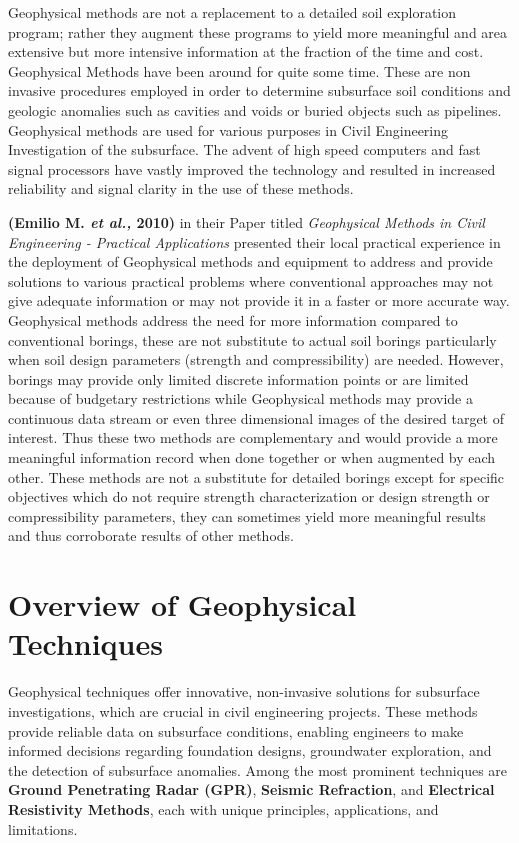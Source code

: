 \documentclass[12pt,a4paper]{report}
\begin{document}
Geophysical methods are not a replacement to a detailed soil exploration program; rather they augment these programs to yield more meaningful and area extensive but more intensive information at the fraction of the time and cost. Geophysical Methods have been around for quite some time. These are non invasive procedures employed in order to determine subsurface soil conditions and geologic anomalies such as cavities and voids or buried objects such as pipelines. Geophysical methods are used for various purposes in Civil Engineering Investigation of the subsurface. The advent of high speed computers and fast signal processors have vastly improved the technology and resulted in increased reliability and signal clarity in the use of these methods.

\textbf{(Emilio M. \textit{et al.,} 2010)} in their Paper titled \textit{Geophysical Methods in Civil Engineering - Practical Applications} presented their local practical experience in the deployment of Geophysical methods and equipment to address and provide solutions to various practical problems where conventional approaches may not give adequate information or may not provide it in a faster or more accurate way. Geophysical methods address the need for more information compared to conventional borings, these are not substitute to actual soil borings particularly when soil design parameters (strength and compressibility) are needed. However, borings may provide only limited discrete information points or are limited because of budgetary restrictions while Geophysical methods may provide a continuous data stream or even three dimensional images of the desired target of interest. Thus these two methods are complementary and would provide a more meaningful information record when done together or when augmented by each other. These methods are not a substitute for detailed borings except for specific objectives which do not require strength characterization or design strength or compressibility parameters, they can sometimes yield more meaningful results and thus corroborate results of other methods.

\section{Overview of Geophysical Techniques}
Geophysical techniques offer innovative, non-invasive solutions for subsurface investigations, which are crucial in civil engineering projects. These methods provide reliable data on subsurface conditions, enabling engineers to make informed decisions regarding foundation designs, groundwater exploration, and the detection of subsurface anomalies. Among the most prominent techniques are \textbf{Ground Penetrating Radar (GPR)}, \textbf{Seismic Refraction}, and \textbf{Electrical Resistivity Methods}, each with unique principles, applications, and limitations.
\end{document}
